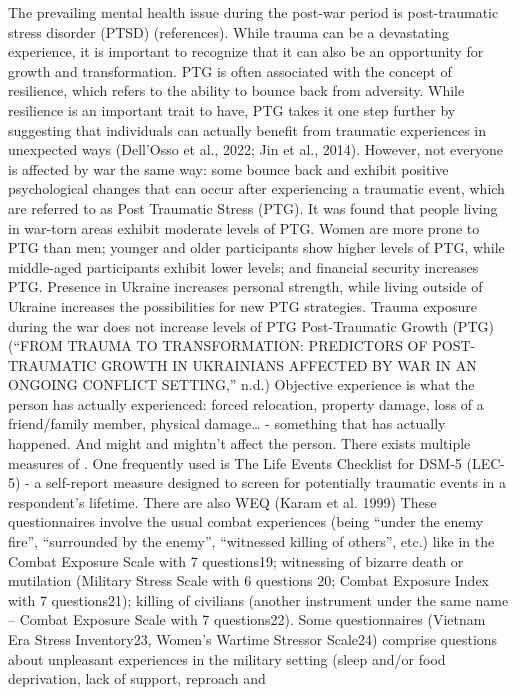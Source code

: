 \documentclass[
  letterpaper,
  DIV=11,
  numbers=noendperiod]{scrartcl}
\begin{document}
The prevailing mental health issue during the post-war period is
post-traumatic stress disorder (PTSD) (references). While trauma can be
a devastating experience, it is important to recognize that it can also
be an opportunity for growth and transformation. PTG is often associated
with the concept of resilience, which refers to the ability to bounce
back from adversity. While resilience is an important trait to have, PTG
takes it one step further by suggesting that individuals can actually
benefit from traumatic experiences in unexpected ways (Dell'Osso et al.,
2022; Jin et al., 2014). However, not everyone is affected by war the
same way: some bounce back and exhibit positive psychological changes
that can occur after experiencing a traumatic event, which are referred
to as Post Traumatic Stress (PTG). It was found that people living in
war-torn areas exhibit moderate levels of PTG. Women are more prone to
PTG than men; younger and older participants show higher levels of PTG,
while middle-aged participants exhibit lower levels; and financial
security increases PTG. Presence in Ukraine increases personal strength,
while living outside of Ukraine increases the possibilities for new PTG
strategies. Trauma exposure during the war does not increase levels of
PTG Post-Traumatic Growth (PTG) (``FROM TRAUMA TO TRANSFORMATION:
PREDICTORS OF POST-TRAUMATIC GROWTH IN UKRAINIANS AFFECTED BY WAR IN AN
ONGOING CONFLICT SETTING,'' n.d.) Objective experience is what the
person has actually experienced: forced relocation, property damage,
loss of a friend/family member, physical damage\ldots{} - something that
has actually happened. And might and mightn't affect the person. There
exists multiple measures of . One frequently used is The Life Events
Checklist for DSM-5 (LEC-5) - a self-report measure designed to screen
for potentially traumatic events in a respondent's lifetime. There are
also WEQ (Karam et al. 1999) These questionnaires involve the usual
combat experiences (being ``under the enemy fire'', ``surrounded by the
enemy'', ``witnessed killing of others'', etc.) like in the Combat
Exposure Scale with 7 questions19; witnessing of bizarre death or
mutilation (Military Stress Scale with 6 questions 20; Combat Exposure
Index with 7 questions21); killing of civilians (another instrument
under the same name -- Combat Exposure Scale with 7 questions22). Some
questionnaires (Vietnam Era Stress Inventory23, Women's Wartime Stressor
Scale24) comprise questions about unpleasant experiences in the military
setting (sleep and/or food deprivation, lack of support, reproach and
\end{document}
